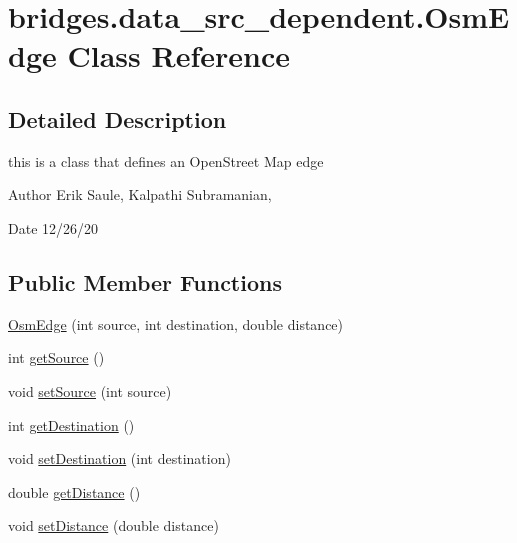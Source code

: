 \hypertarget{classbridges_1_1data__src__dependent_1_1_osm_edge}{}\section{bridges.\+data\+\_\+src\+\_\+dependent.\+Osm\+Edge Class Reference}
\label{classbridges_1_1data__src__dependent_1_1_osm_edge}


\subsection{Detailed Description}
this is a class that defines an Open\+Street Map edge 

\begin{DoxyAuthor}{Author}
Erik Saule, Kalpathi Subramanian, 
\end{DoxyAuthor}
\begin{DoxyDate}{Date}
12/26/20 
\end{DoxyDate}
\subsection*{Public Member Functions}
\begin{DoxyCompactItemize}
\item 
\hyperlink{classbridges_1_1data__src__dependent_1_1_osm_edge_a87b1d4efb3d94d8109b18f29882475f6}{Osm\+Edge} (int source, int destination, double distance)
\item 
int \hyperlink{classbridges_1_1data__src__dependent_1_1_osm_edge_a4ffc915a30144db8e3c1521772a6a26d}{get\+Source} ()
\item 
void \hyperlink{classbridges_1_1data__src__dependent_1_1_osm_edge_aa61fb02ce746b89c26c71cd2f20053e7}{set\+Source} (int source)
\item 
int \hyperlink{classbridges_1_1data__src__dependent_1_1_osm_edge_a9695950217254c113eada4019d647977}{get\+Destination} ()
\item 
void \hyperlink{classbridges_1_1data__src__dependent_1_1_osm_edge_a0bfcd0bd6dc7a4e97a078a67e41df445}{set\+Destination} (int destination)
\item 
double \hyperlink{classbridges_1_1data__src__dependent_1_1_osm_edge_a0bad934b9b643d5d0e375eb4210601a5}{get\+Distance} ()
\item 
void \hyperlink{classbridges_1_1data__src__dependent_1_1_osm_edge_afe9d2fa452c89d08d7c1a23ff3302c62}{set\+Distance} (double distance)
\end{DoxyCompactItemize}


